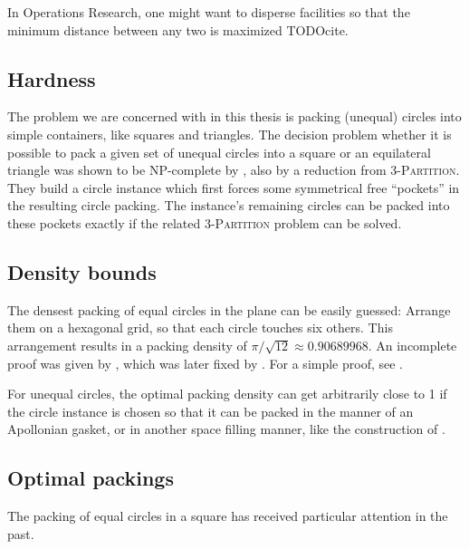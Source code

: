 \documentclass[a4paper,style=print,bibliography=totoc,nexus,lnum,extramargin]{tubsbook}
\begin{document}
In Operations Research, one might want to disperse facilities so that the minimum distance between any two is maximized TODOcite.


\subsection{Hardness}

The problem we are concerned with in this thesis is packing (unequal) circles into simple containers, like squares and triangles. The decision problem whether it is possible to pack a given set of unequal circles into a square or an equilateral triangle was shown to be NP-complete by \textcite{DFL2010circle}, also by a reduction from \textsc{3-Partition}. They build a circle instance which first forces some symmetrical free “pockets” in the resulting circle packing. The instance's remaining circles can be packed into these pockets exactly if the related \textsc{3-Partition} problem can be solved.

\subsection{Density bounds}

The densest packing of equal circles in the plane can be easily guessed: Arrange them on a hexagonal grid, so that each circle touches six others. This arrangement results in a packing density of $\pi/\sqrt{12} \approx 0.90689968$. An incomplete proof was given by \textcite{thue1892om}, which was later fixed by \textcite{fejestoth1940uber}. For a simple proof, see \cite{CW2010simple}.

For unequal circles, the optimal packing density can get arbitrarily close to 1 if the circle instance is chosen so that it can be packed in the manner of an Apollonian gasket, or in another space filling manner, like the construction of \textcite{bourke2011random}.

\subsection{Optimal packings}

The packing of equal circles in a square has received particular attention in the past.
\end{document}
